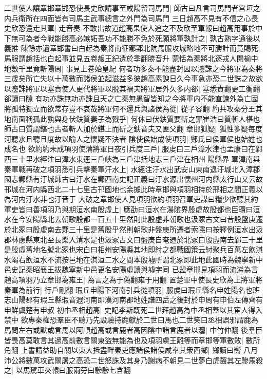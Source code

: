二世使人讓章邯章邯恐使長史欣請事至咸陽留司馬門|{
	師古曰凡言司馬門者宫垣之内兵衛所在四面皆有司馬主武事總言之外門為司馬門}
三日趙高不見有不信之心長史欣恐還走其軍|{
	走音奏}
不敢出故道趙高果使人追之不及欣至軍報曰趙高用事於中下無可為者今戰能勝高必嫉妬吾功不能勝不免於死願將軍孰計之|{
	孰古熟字通後以義推}
陳餘亦遺章邯書曰白起為秦將南征鄢郢北阬馬服攻城略地不可勝計而竟賜死|{
	馬服謂趙括也白起事並見五卷赧王紀遺於季翻勝音升}
蒙恬為秦將北逐戎人開榆中地數千里竟斬陽周|{
	事見上卷始皇紀}
何者功多秦不能盡封因以灋誅之今將軍為秦將三歲矣所亡失以十萬數而諸侯並起滋益多彼趙高素諛日久今事急亦恐二世誅之故欲以灋誅將軍以塞責使人更代將軍以脱其禍夫將軍居外久多内郤|{
	塞悉責翻更工衡翻郤讀曰隙}
有功亦誅無功亦誅且天之亡秦無愚智皆知之今將軍内不能直諫外為亡國將孤特獨立而欲常存豈不哀哉將軍何不還兵與諸侯為從|{
	從子容翻}
約共攻秦分王其地南面稱孤此孰與身伏鈇質妻子為戮乎|{
	何休曰伏鈇質要斬之罪崔浩曰質斬人椹也師古曰質謂鍖也古者斬人加於鍖上而斫之鈇音夫又匪父翻}
章邯狐疑|{
	狐性多疑每度河聽水且聽且度故以喻人之懷疑不決者}
隂使侯始成使項羽|{
	鄭氏曰侯軍侯也始姓也成名也}
欲約約未成項羽使蒲將軍日夜引兵度三戶|{
	服䖍曰三戶漳水津也孟康曰在鄴西三十里水經注曰漳水東逕三戶峽為三戶津括地志三戶津在相州陽縣界}
軍漳南與秦軍戰再破之項羽悉引兵擊秦軍汗水上|{
	水經注汙水出武安山東南退汙城北入漳郡國志鄴縣有汙城師古曰汙水在鄴西南史記正義曰汙水源出懷州河内縣太行山又云故邗城在河内縣西北二十七里古邗國地也余據此時章邯與項羽相持於邢相之間正義以為河内汙水非也汙音于}
大破之章邯使人見項羽欲約項羽召軍吏謀曰糧少欲聽其約軍吏皆曰善項羽乃與期洹水南殷虛上|{
	應劭曰洹水在湯隂界殷虚故殷都也臣瓚曰洹水在今安陽縣北去朝歌殷都一百五十里然則此殷虛非朝歌也汲冢古文曰昔殷盤庚遷於北冢曰殷虚南去鄴三十里是舊殷乎然則朝歌非盤庚所遷者索隱曰按釋例洹水出汲郡林慮縣東北至長樂入清水是也汲冢古文曰盤庚自奄遷於北冢曰殷虛南去鄴三十里是殷虛舊地名號北冢也宋白曰相州安陽縣其地即紂之都戰國策云紂聚兵百萬左飲淇水竭右飲洹水不流按邑地在淇洹二水之間本殷墟所謂北冢即此地此國時為魏寧新中邑史記秦昭襄王拔魏寧新中邑更名安陽虛讀與墟字同}
已盟章邯見項羽而流涕為言趙高項羽乃立章邯為雍王|{
	為言之為于偽翻雍于用翻}
置楚軍中使長史欣為上將軍將秦軍為前行|{
	行戶剛翻}
瑕丘申陽下河南引兵從項羽|{
	服䖍曰瑕丘縣名申姓陽名也班志山陽郡有瑕丘縣瑕音遐河南即漢河南郡地姓譜四岳之後封於申周有申伯左傳齊有申鮮虞楚有申叔}
初中丞相趙高|{
	史記李斯既死二世拜趙高為中丞相蓋以其宦人得入禁中}
欲專秦權恐羣臣不聽乃先設驗持鹿獻於二世曰馬也二世笑曰丞相誤邪謂鹿為馬問左右或默或言馬以阿順趙高或言鹿者高因陰中諸言鹿者以灋|{
	中竹仲翻}
後羣臣皆畏高莫敢言其過高前數言關東盜無能為也及項羽虜王離等而章邯等軍數敗|{
	數所角翻}
上書請益助自關以東大抵盡畔秦吏應諸侯諸侯咸率其衆西鄉|{
	鄉讀曰嚮}
八月沛公將數萬攻武關屠之高恐二世怒誅及其身乃謝病不朝見二世夢白虎齧其左驂馬殺之|{
	以馬駕車夾轅曰服兩旁曰驂驂七含翻}
